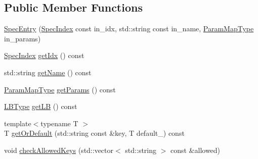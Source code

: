 \subsection*{Public Member Functions}
\begin{DoxyCompactItemize}
\item 
\hyperlink{structvt_1_1vrt_1_1collection_1_1balance_1_1_spec_entry_a40db52d556685cb73056409096a4d4f7}{Spec\+Entry} (\hyperlink{namespacevt_1_1vrt_1_1collection_1_1balance_a72a5e0d9936ddf57f8e6c64e0e9fd123}{Spec\+Index} const in\+\_\+idx, std\+::string const in\+\_\+name, \hyperlink{structvt_1_1vrt_1_1collection_1_1balance_1_1_spec_entry_a2ec68beff648a236f7f527dc5deeb4c5}{Param\+Map\+Type} in\+\_\+params)
\item 
\hyperlink{namespacevt_1_1vrt_1_1collection_1_1balance_a72a5e0d9936ddf57f8e6c64e0e9fd123}{Spec\+Index} \hyperlink{structvt_1_1vrt_1_1collection_1_1balance_1_1_spec_entry_a665d82dc37723e5392d215973eb1e73b}{get\+Idx} () const
\item 
std\+::string \hyperlink{structvt_1_1vrt_1_1collection_1_1balance_1_1_spec_entry_a1a6b18669456c0d4c9c311c63fd912c8}{get\+Name} () const
\item 
\hyperlink{structvt_1_1vrt_1_1collection_1_1balance_1_1_spec_entry_a2ec68beff648a236f7f527dc5deeb4c5}{Param\+Map\+Type} \hyperlink{structvt_1_1vrt_1_1collection_1_1balance_1_1_spec_entry_acfc8e49ab1e8b1c10cd8b0330386476c}{get\+Params} () const
\item 
\hyperlink{namespacevt_1_1vrt_1_1collection_1_1balance_ac4f99693509affcc67db182d4aad9b5c}{L\+B\+Type} \hyperlink{structvt_1_1vrt_1_1collection_1_1balance_1_1_spec_entry_a265df7d1bc8ac20e92c7799fd4973018}{get\+LB} () const
\item 
{\footnotesize template$<$typename T $>$ }\\T \hyperlink{structvt_1_1vrt_1_1collection_1_1balance_1_1_spec_entry_ae5c35506e15c2123029d071a284b9367}{get\+Or\+Default} (std\+::string const \&key, T default\+\_\+) const
\item 
void \hyperlink{structvt_1_1vrt_1_1collection_1_1balance_1_1_spec_entry_a86ea05b64615f7be99e8db3baf195aae}{check\+Allowed\+Keys} (std\+::vector$<$ std\+::string $>$ const \&allowed)
\end{DoxyCompactItemize}
